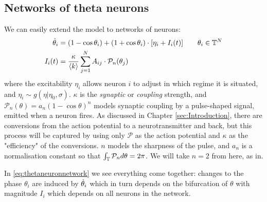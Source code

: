 \subsection{Networks of theta neurons}
We can easily extend the model to networks of neurons:
\begin{align}
\dot{\theta}_{i} &=\left(1-\cos \theta_{i}\right)+\left(1+\cos \theta_{i}\right) \cdot \left[\eta_{i} + I_{i}(t)\right] \qquad \theta_i \in \T^N  \label{eq:thetaneuronnetwork} \\
I_{i}(t) &=\frac{\kappa}{\kmean} \sum_{j=1}^{N} A_{i j} \cdot \mathcal{P}_{n}(\theta_{j}) \label{eq:thetaneuronnetworkcurrent}
\end{align}
where the excitability $\eta_i$ allows neuron $i$ to adjust in which regime it is situated, and $\eta_i \sim g(\eta \rvert \eta_0, \sigma)$. $\kappa$ is the \textsl{synaptic} or \textsl{coupling} strength, and $\mathcal{P}_n(\theta)  = a_n(1 - \cos \theta)^n$ models synaptic coupling by a pulse-shaped signal, emitted when a neuron fires. As discussed in Chapter \ref{sec:Introduction}, there are conversions from the action potential to a neurotransmitter and back, but this process will be captured by using only $\mathcal{P}$ as the action potential and $\kappa$ as the "efficiency" of the conversions. $n$ models the sharpness of the pulse, and $a_n$ is a normalisation constant so that $\int_{{\mathbb{T}}} \mathcal{P}_{n} d \theta=2 \pi$. We will take $n=2$ from here, as in\cite{Luke2013, OttAntonsen2017, Martens2020}. 

In \eqref{eq:thetaneuronnetwork} we see everything come together: changes to the phase $\theta_i$ are induced by ${\dot{\theta}}_i$ which in turn depends on the bifurcation of $\theta$ with magnitude $I_i$ which depends on all neurons in the network. \\


